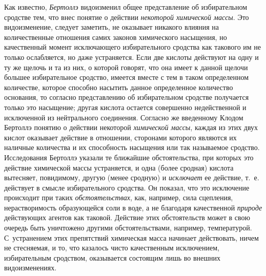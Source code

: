 Как известно, {\em Бертоллэ} видоизменил общее
представление об избирательном сродстве тем, что внес понятие о действии
{\em некоторой химической массы}. Это видоизменение,
следует заметить, не оказывает никакого влияния на количественные отношения
самих законов химического насыщения, но качественный момент исключающего
избирательного сродства как такового им не только ослабляется, но даже
устраняется. Если две кислоты действуют на одну и ту же щелочь и та из них,
о которой говорят, что она имеет к данной щелочи большее избирательное
сродство, имеется вместе с тем в таком определенном количестве, которое
способно насытить данное определенное количество основания, то согласно
представлению об избирательном
сродстве
получается только это насыщение; другая кислота остается совершенно
недейственной и исключенной из нейтрального соединения. Согласно же
введенному Клодом Бертоллэ понятию о действии некоторой
{\em химической массы}, каждая из этих двух кислот
оказывает действие в отношении, сторонами которого являются их наличные
количества и их способность насыщения или так называемое сродство.
Исследования Бертоллэ указали те ближайшие обстоятельства, при которых это
действие химической массы устраняется, и одна (более сродная) кислота
вытесняет, повидимому, другую (менее сродную) и
{\em исключает} ее действие, т.~е. действует в смысле
избирательного сродства. Он показал, что это исключение происходит при
таких {\em обстоятельствах}, как, например, сила
сцепления, нерастворимость образующейся соли в воде, а не благодаря
качественной {\em природе} действующих агентов как
таковой. Действие этих обстоятельств может в свою очередь быть уничтожено
другими обстоятельствами, например, температурой. С~устранением этих
препятствий химическая масса начинает действовать, ничем не стесняемая,
 и то, что
казалось чисто качественным исключением, избирательным сродством,
оказывается состоящим лишь во внешних видоизменениях.

